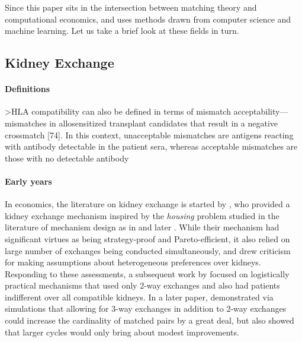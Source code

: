\documentclass[12pt]{article}
\begin{document}
Since this paper sits in the intersection between matching theory and computational economics, and uses methods drawn from computer science and machine learning. Let us take a brief look at these fields in turn. 


\subsection{Kidney Exchange} \label{subsec:kidney}

\paragraph{Definitions} 

>HLA compatibility can also be defined in terms of
mismatch acceptability—mismatches in allosensitized
transplant candidates that result in a negative crossmatch
[74]. In this context, unacceptable mismatches are antigens
reacting with antibody detectable in the patient
sera, whereas acceptable mismatches are those with no
detectable antibody


\paragraph{Early years} In economics, the literature on kidney exchange is started by \cite{roth2004kidney}, who provided a kidney exchange mechanism inspired by the \emph{housing} problem studied in the literature of mechanism design as in \cite{shapley1974cores} and later \cite{abdulkadirouglu1999house}. While their mechanism had significant virtues as being strategy-proof and Pareto-efficient, it also relied on large number of exchanges being conducted simultaneously, and drew criticism for making assumptions about heterogeneous preferences over kidneys. Responding to these assessments, a subsequent work by \cite{roth2005pairwise} focused on logistically practical mechanisms that used only 2-way exchanges and also had patients indifferent over all compatible kidneys. In a later paper, \cite{roth2007efficient} demonstrated via simulations that allowing for 3-way exchanges in addition to 2-way exchanges could increase the cardinality of matched pairs by a great deal, but also showed that larger cycles would only bring about modest improvements.
\end{document}
